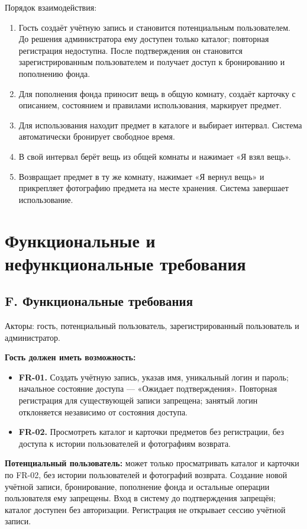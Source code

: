 \documentclass[a4paper,12pt]{article}
\begin{document}
\clearpage
Порядок взаимодействия:
\begin{enumerate}
\item Гость создаёт учётную запись и становится потенциальным пользователем. До решения администратора ему доступен только каталог; повторная регистрация недоступна. После подтверждения он становится зарегистрированным пользователем и получает доступ к бронированию и пополнению фонда.
\item Для пополнения фонда приносит вещь в общую комнату, создаёт карточку с описанием, состоянием и правилами использования, маркирует предмет.
\item Для использования находит предмет в каталоге и выбирает интервал. Система автоматически бронирует свободное время.
\item В свой интервал берёт вещь из общей комнаты и нажимает «Я взял вещь».
\item Возвращает предмет в ту же комнату, нажимает «Я вернул вещь» и прикрепляет фотографию предмета на месте хранения. Система завершает использование.
\end{enumerate}

\clearpage
\section{Функциональные и нефункциональные требования}
\begingroup
\small
{}
\subsection{F. Функциональные требования}
Акторы: гость, потенциальный пользователь, зарегистрированный пользователь и администратор.

\par\noindent\textbf{Гость должен иметь возможность:}
\begin{itemize}[itemsep=0pt]
\item \textbf{FR-01.} Создать учётную запись, указав имя, уникальный логин и пароль; начальное состояние доступа --- «Ожидает подтверждения». Повторная регистрация для существующей записи запрещена; занятый логин отклоняется независимо от состояния доступа.
\item \textbf{FR-02.} Просмотреть каталог и карточки предметов без регистрации, без доступа к истории пользователей и фотографиям возврата.
\end{itemize}
\par\noindent\textbf{Потенциальный пользователь:} может только просматривать каталог и карточки по FR-02, без истории пользователей и фотографий возврата. Создание новой учётной записи, бронирование, пополнение фонда и остальные операции пользователя ему запрещены. Вход в систему до подтверждения запрещён; каталог доступен без авторизации. Регистрация не открывает сессию учётной записи.
\end{document}
